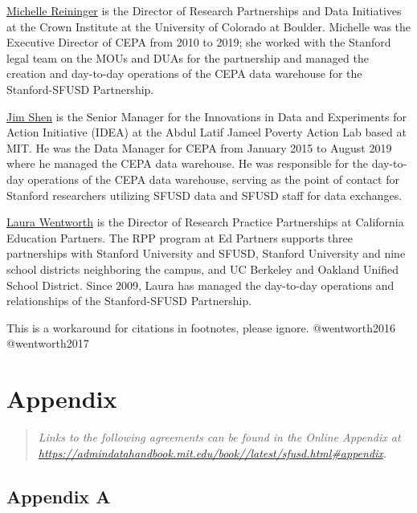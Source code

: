\href{https://www.colorado.edu/crowninstitute/michelle-reininger-phd}{Michelle Reininger} is the Director of Research Partnerships and Data Initiatives at the Crown Institute at the University of Colorado at Boulder. Michelle was the Executive Director of CEPA from 2010 to 2019; she worked with the Stanford legal team on the MOUs and DUAs for the partnership and managed the creation and day-to-day operations of the CEPA data warehouse for the Stanford-SFUSD Partnership.

\href{https://www.povertyactionlab.org/person/shen}{Jim Shen} is the Senior Manager for the Innovations in Data and Experiments for Action Initiative (IDEA) at the Abdul Latif Jameel Poverty Action Lab based at MIT. He was the Data Manager for CEPA from January 2015 to August 2019 where he managed the CEPA data warehouse. He was responsible for the day-to-day operations of the CEPA data warehouse, serving as the point of contact for Stanford researchers utilizing SFUSD data and SFUSD staff for data exchanges.

\href{http://www.caedpartners.org/display/CAED/Our+Team}{Laura Wentworth} is the Director of Research Practice Partnerships at California Education Partners. The RPP program at Ed Partners supports three partnerships with Stanford University and SFUSD, Stanford University and nine school districts neighboring the campus, and UC Berkeley and Oakland Unified School District. Since 2009, Laura has managed the day-to-day operations and relationships of the Stanford-SFUSD Partnership.

\begin{invisible}
This is a workaround for citations in footnotes, please ignore.
@wentworth2016 @wentworth2017
\end{invisible}

\putbib

\FloatBarrier\newpage

\hypertarget{appendix-5}{%
\section*{Appendix}\label{appendix-5}}

\begin{quote}\itshape
Links to the following agreements can be found in the Online Appendix at \url{https://admindatahandbook.mit.edu/book//latest/sfusd.html#appendix}.
\end{quote}

\hypertarget{sfusd-appendixa}{%
\subsection*{Appendix A}\label{sfusd-appendixa}}

